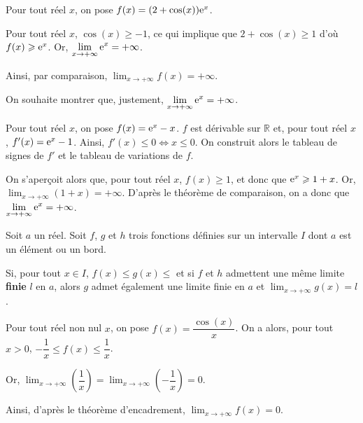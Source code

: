\documentclass[11pt,fleqn, openany]{book} %
\begin{document}
\begin{example}Pour tout réel $x$, on pose $f(x)=(2+\cos(x))\mathrm{e}^x$. 

Pour tout réel $x$, $\cos(x)\geqslant -1$, ce qui implique que $2+\cos(x)\geqslant 1$ d'où $f(x)\geqslant \mathrm{e}^x$. Or, $\displaystyle \lim_{x \to +\infty} \mathrm{e}^x=+\infty$. 

Ainsi, par comparaison, $\displaystyle \lim_{x \to +\infty} f(x)=+\infty$.\end{example}

\begin{example}On souhaite montrer que, justement, $\displaystyle \lim_{x \to +\infty}\mathrm{e}^x=+\infty$. 

Pour tout réel $x$, on pose $f(x)=\mathrm{e}^x-x$. $f$ est dérivable sur $\mathbb{R}$ et, pour tout réel $x$, $f'(x)=\mathrm{e}^x-1$. Ainsi, $f'(x)\leqslant 0 \Leftrightarrow x \leqslant 0$. On construit alors le tableau de signes de $f'$ et le tableau de variations de $f$.
\begin{center}
\end{center}

On s'aperçoit alors que, pour tout réel $x$, $f(x) \geqslant 1$, et donc que $\mathrm{e}^x \geqslant 1+x$. Or,  $\displaystyle \lim_{x \to +\infty} (1+x)=+\infty$. D'après le théorème de comparaison, on a donc que  $\displaystyle \lim_{x \to +\infty} \mathrm{e}^x = +\infty$.\end{example}

\newpage


\begin{theorem}Soit $a$ un réel. Soit $f$, $g$ et $h$ trois fonctions définies sur un intervalle $I$ dont $a$ est un élément ou un bord.

Si, pour tout $x\in I$, $f(x)\leqslant g(x)\leqslant$ et si $f$ et $h$ admettent une même limite \textbf{finie} $l$ en $a$, alors $g$ admet également une limite finie en $a$ et $\displaystyle \lim_{x \to +\infty} g(x)=l$.
\end{theorem}

\begin{example}Pour tout réel non nul $x$, on pose $f(x)=\dfrac{\cos(x)}{x}$. On a alors, pour tout $x>0$, $-\dfrac{1}{x} \leqslant f(x) \leqslant \dfrac{1}{x}$.

 Or, $\displaystyle \lim_{x \to +\infty} \left( \dfrac{1}{x}\right) =\displaystyle \lim_{x \to +\infty} \left(-\dfrac{1}{x}\right)=0$. 
 
 Ainsi, d'après le théorème d'encadrement, $\displaystyle \lim_{x \to +\infty}f(x)=0$.\end{example}
 
\end{document}
